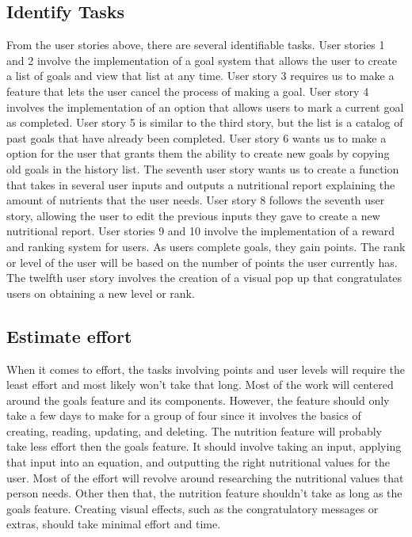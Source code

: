 \documentclass[a4paper]{article}
\begin{document}
\subsection{Identify Tasks}
From the user stories above, there are several identifiable tasks.  User stories 1 and 2 involve the implementation of a goal system that allows the user to create a list of goals and view that list at any time.  
\newline
\newline
User story 3 requires us to make a feature that lets the user cancel the process of making a goal.  
\newline
\newline
User story 4 involves the implementation of an option that allows users to mark a current goal as completed.
\newline
\newline
User story 5 is similar to the third story, but the list is a catalog of past goals that have already been completed.
\newline
\newline
User story 6 wants us to make a option for the user that grants them the ability to create new goals by copying old goals in the history list. 
\newline
\newline
The seventh user story wants us to create a function that takes in several user inputs and outputs a nutritional report explaining the amount of nutrients that the user needs. 
User story 8 follows the seventh user story, allowing the user to edit the previous inputs they gave to create a new nutritional report.
\newline
\newline
User stories 9 and 10 involve the implementation of a reward and ranking system for users.  As users complete goals, they gain points.  The rank or level of the user will be based on the number of points the user currently has.
\newline
\newline
The twelfth user story involves the creation of a visual pop up that congratulates users on obtaining a new level or rank.
\newline
\subsection{Estimate effort}
When it comes to effort, the tasks involving points and user levels will require the least effort and most likely won't take that long.  Most of the work will centered around the goals feature and its components.  However, the feature should only take a few days to make for a group of four since it involves the basics of creating, reading, updating, and deleting. The nutrition feature will probably take less effort then the goals feature.  It should involve taking an input, applying that input into an equation, and outputting the right nutritional values for the user.  Most of the effort will revolve around researching the nutritional values that person needs.  Other then that, the nutrition feature shouldn't take as long as the goals feature.  Creating visual effects, such as the congratulatory messages or extras, should take minimal effort and time.
\end{document}
